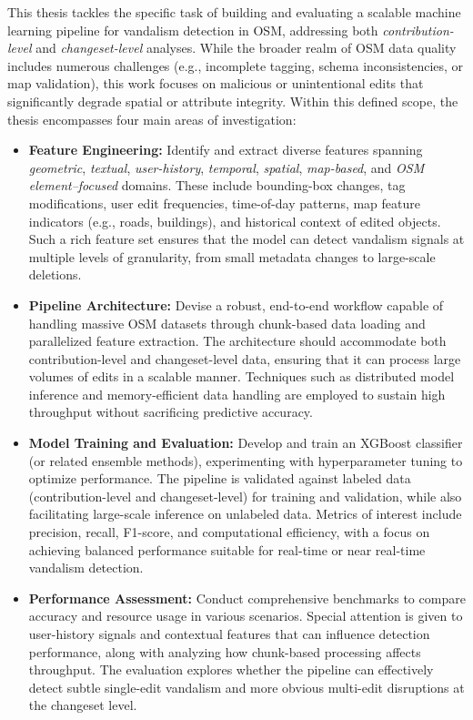 \documentclass[
    13pt, %
    a4paper, %
    twoside, 
    DIV14, %
    listof=totoc, %
    bibliography=totoc, %
    index=totoc, %
    headsepline
]{scrreprt}
\begin{document}
This thesis tackles the specific task of building and evaluating a scalable machine learning pipeline for vandalism detection in OSM, addressing both \emph{contribution-level} and \emph{changeset-level} analyses. While the broader realm of OSM data quality includes numerous challenges (e.g., incomplete tagging, schema inconsistencies, or map validation), this work focuses on malicious or unintentional edits that significantly degrade spatial or attribute integrity. Within this defined scope, the thesis encompasses four main areas of investigation:
\begin{itemize}
    \item \textbf{Feature Engineering:} Identify and extract diverse features spanning \emph{geometric}, \emph{textual}, \emph{user-history}, \emph{temporal}, \emph{spatial}, \emph{map-based}, and \emph{OSM element–focused} domains. These include bounding-box changes, tag modifications, user edit frequencies, time-of-day patterns, map feature indicators (e.g., roads, buildings), and historical context of edited objects. Such a rich feature set ensures that the model can detect vandalism signals at multiple levels of granularity, from small metadata changes to large-scale deletions.
    \item \textbf{Pipeline Architecture:} Devise a robust, end-to-end workflow capable of handling massive OSM datasets through chunk-based data loading and parallelized feature extraction. The architecture should accommodate both contribution-level and changeset-level data, ensuring that it can process large volumes of edits in a scalable manner. Techniques such as distributed model inference and memory-efficient data handling are employed to sustain high throughput without sacrificing predictive accuracy.
    \item \textbf{Model Training and Evaluation:} Develop and train an XGBoost classifier (or related ensemble methods), experimenting with hyperparameter tuning to optimize performance. The pipeline is validated against labeled data (contribution-level and changeset-level) for training and validation, while also facilitating large-scale inference on unlabeled data. Metrics of interest include precision, recall, F1-score, and computational efficiency, with a focus on achieving balanced performance suitable for real-time or near real-time vandalism detection.
    \item \textbf{Performance Assessment:} Conduct comprehensive benchmarks to compare accuracy and resource usage in various scenarios. Special attention is given to user-history signals and contextual features that can influence detection performance, along with analyzing how chunk-based processing affects throughput. The evaluation explores whether the pipeline can effectively detect subtle single-edit vandalism and more obvious multi-edit disruptions at the changeset level.
\end{itemize}
\end{document}
